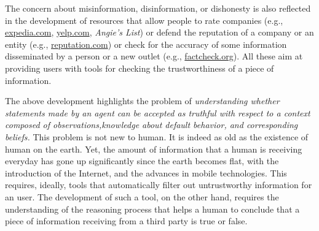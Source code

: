 \documentclass{article}
\newcommand{\memo}[1]{
  \ifthenelse {\boolean{includeMemo}}{\medskip\noindent\fbox{\begin{minipage}[b]{\dimexpr\linewidth-1em}#1\end{minipage}}\medskip\newline} 
}
\newtheorem{example}{Example}%
\begin{document}
The concern about misinformation, disinformation, or dishonesty is also reflected in the 
development of resources that allow people to rate companies (e.g., \url{expedia.com}, \url{yelp.com},  \emph{Angie's List}) or defend the reputation of a company or an entity (e.g., \url{reputation.com}) or check for the accuracy of some information disseminated by a person or a new outlet (e.g., \url{factcheck.org}). All these aim at providing users with tools for checking the trustworthiness of a piece of information. 

The above development highlights the problem of  \emph{understanding whether statements made by an agent can be accepted as truthful with respect to a context composed of observations,knowledge about default behavior, and corresponding beliefs.} This problem is not new to human. It is indeed as old as the existence of human on the earth. Yet, the amount of information that a human is receiving everyday has gone up significantly since the earth becomes flat, with the introduction of the Internet, and the advances in mobile technologies. This requires, ideally, tools that automatically filter out untrustworthy information for an user. The development of such a tool, on the other hand, requires the understanding of the reasoning process that helps a human to conclude that a piece of information receiving from a third party is true or false.   
 
  

%


\end{document}
